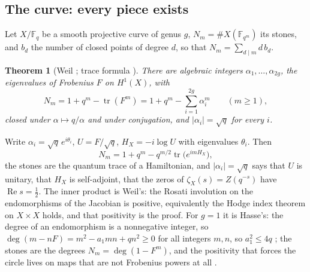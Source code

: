 \documentclass[11pt]{article}
\newtheorem{theorem}{Theorem}[section]
\theoremstyle{definition}
\theoremstyle{remark}
\newcommand{\F}{\mathbb F}
\newcommand{\Ree}{\operatorname{Re}}
\begin{document}
\subsection{The curve: every piece exists}
Let $X/\F_q$ be a smooth projective curve of genus $g$, $N_m=\#X(\F_{q^m})$ its stones, and $b_d$ the number of closed points of degree $d$, so that $N_m=\sum_{d\mid m}d\,b_d$.
\begin{theorem}[Weil \cite{weil48}; trace formula {\cite[Ch.\ VI]{milneEC}}]\label{thm:weilcurve}
There are algebraic integers $\alpha_1,\dots,\alpha_{2g}$, the eigenvalues of Frobenius $F$ on $H^1(X)$, with
\[
N_m=1+q^m-\operatorname{tr}(F^m)=1+q^m-\sum_{i=1}^{2g}\alpha_i^m\qquad(m\ge1),
\]
closed under $\alpha\mapsto q/\alpha$ and under conjugation, and $|\alpha_i|=\sqrt q$ for every $i$.
\end{theorem}
Write $\alpha_i=\sqrt q\,e^{i\theta_i}$, $U=F/\sqrt q$, $H_X=-i\log U$ with eigenvalues $\theta_i$. Then
\[
N_m=1+q^m-q^{m/2}\operatorname{tr}\big(e^{imH_X}\big),
\]
the stones are the quantum trace of a Hamiltonian, and $|\alpha_i|=\sqrt q$ says that $U$ is unitary, that $H_X$ is self-adjoint, that the zeros of $\zeta_X(s)=Z(q^{-s})$ have $\Ree s=\tfrac12$. The inner product is Weil's: the Rosati involution on the endomorphisms of the Jacobian is positive, equivalently the Hodge index theorem on $X\times X$ holds, and that positivity is the proof. For $g=1$ it is Hasse's: the degree of an endomorphism is a nonnegative integer, so $\deg(m-nF)=m^2-a_1mn+qn^2\ge0$ for all integers $m,n$, so $a_1^2\le4q$ \cite[Ch.\ V]{silverman}; the stones are the degrees $N_m=\deg(1-F^m)$, and the positivity that forces the circle lives on maps that are not Frobenius powers at all \cite{reading}.
\end{document}
